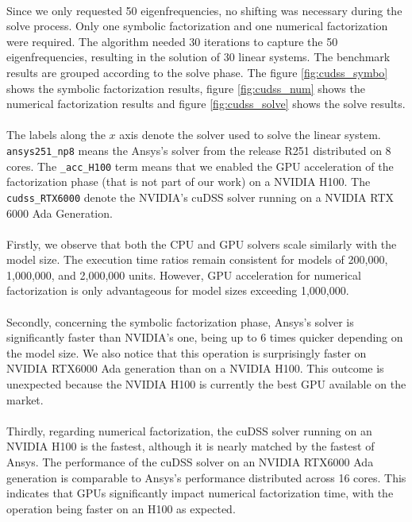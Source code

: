 \paragraph*{}
Since we only requested 50 eigenfrequencies, no shifting was necessary during the solve process. Only one symbolic factorization and one numerical factorization were required. The algorithm needed 30 iterations to capture the 50 eigenfrequencies, resulting in the solution of 30 linear systems. The benchmark results are grouped according to the solve phase. The figure \ref{fig:cudss_symbo} shows the symbolic factorization results, figure \ref{fig:cudss_num} shows the numerical factorization results and figure \ref{fig:cudss_solve} shows the solve results.

\paragraph*{}
The labels along the $x$ axis denote the solver used to solve the linear system. \texttt{ansys251\_np8} means the Ansys's solver from the release R251 distributed on 8 cores. The \texttt{\_acc\_H100} term means that we enabled the GPU acceleration of the factorization phase (that is not part of our work) on a NVIDIA H100. The \texttt{cudss\_RTX6000} denote the NVIDIA's cuDSS solver running on a NVIDIA RTX 6000 Ada Generation.

\paragraph*{}
Firstly, we observe that both the CPU and GPU solvers scale similarly with the model size. The execution time ratios remain consistent for models of 200,000, 1,000,000, and 2,000,000 units. However, GPU acceleration for numerical factorization is only advantageous for model sizes exceeding 1,000,000.

\paragraph*{}
Secondly, concerning the symbolic factorization phase, Ansys's solver is significantly faster than NVIDIA's one, being up to 6 times quicker depending on the model size. We also notice that this operation is surprisingly faster on NVIDIA RTX6000 Ada generation than on a NVIDIA H100. This outcome is unexpected because the NVIDIA H100 is currently the best GPU available on the market.

\paragraph*{}
Thirdly, regarding numerical factorization, the cuDSS solver running on an NVIDIA H100 is the fastest, although it is nearly matched by the fastest of Ansys. The performance of the cuDSS solver on an NVIDIA RTX6000 Ada generation is comparable to Ansys's performance distributed across 16 cores. This indicates that GPUs significantly impact numerical factorization time, with the operation being faster on an H100 as expected.

